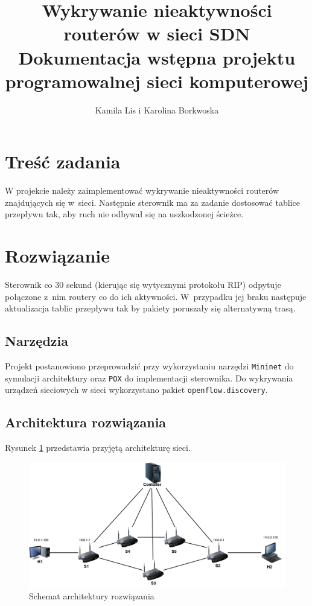 \documentclass{article}
\date{}
\author{Kamila Lis i Karolina Borkwoska}
\title{Wykrywanie nieaktywności routerów w sieci SDN\\
	{\large Dokumentacja wstępna projektu programowalnej sieci komputerowej}}
\begin{document}
	\maketitle
	\section{Treść zadania}
	W projekcie należy zaimplementować wykrywanie nieaktywności routerów znajdujących się w~sieci. Następnie sterownik ma za zadanie dostosować tablice przepływu tak, aby ruch nie odbywał się na uszkodzonej ścieżce.
	\section{Rozwiązanie} 
	Sterownik co 30 sekund (kierując się wytycznymi protokołu RIP) odpytuje połączone z~nim routery co do ich aktywności. W~przypadku jej braku następuje aktualizacja tablic przepływu tak by pakiety poruszały się alternatywną trasą.
	\subsection{Narzędzia}
	Projekt postanowiono przeprowadzić przy wykorzystaniu narzędzi \texttt{Mininet} do symulacji architektury oraz \texttt{POX} do implementacji sterownika. Do wykrywania urządzeń sieciowych w sieci wykorzystano pakiet \texttt{openflow.discovery}.
	\subsection{Architektura rozwiązania}
	Rysunek \ref{f:arch} przedstawia przyjętą architekturę sieci. 
	\begin{figure}
		\centering
		\includegraphics[scale = 0.60]{../images/psik_topology_2.pdf}
		\caption{Schemat architektury rozwiązania}
		\label{f:arch}
	\end{figure}
\end{document}
